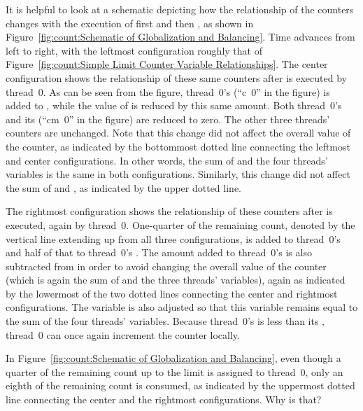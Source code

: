It is helpful to look at a schematic depicting how the relationship
of the counters changes with the execution of first
 and then , as shown in
Figure~\ref{fig:count:Schematic of Globalization and Balancing}.
Time advances from left to right, with the leftmost configuration
roughly that of
Figure~\ref{fig:count:Simple Limit Counter Variable Relationships}.
The center configuration shows the relationship of these same counters
after  is executed by thread~0.
As can be seen from the figure, thread~0's  (``c~0'' in
the figure) is added to , while the value of
 is reduced by this same amount.
Both thread~0's  and its 
(``cm~0'' in the figure) are reduced to zero.
The other three threads' counters are unchanged.
Note that this change did not affect the overall value of the counter,
as indicated by the bottommost dotted line connecting the leftmost
and center configurations.
In other words, the sum of  and the four threads'
 variables is the same in both configurations.
Similarly, this change did not affect the sum of  and
, as indicated by the upper dotted line.

The rightmost configuration shows the relationship of these counters
after  is executed, again by thread~0.
One-quarter of the remaining count, denoted by the vertical line extending
up from all three configurations, is added to thread~0's
 and half of that to thread~0's .
The amount added to thread~0's  is also subtracted from
 in order to avoid changing the overall value of the
counter (which is again the sum of  and the three
threads'  variables), again as indicated by the lowermost
of the two dotted lines connecting the center and rightmost configurations.
The  variable is also adjusted so that this variable
remains equal to the sum of the four threads' 
variables.
Because thread~0's  is less than its ,
thread~0 can once again increment the counter locally.

\QuickQuiz{}
	In Figure~\ref{fig:count:Schematic of Globalization and Balancing},
	even though a quarter of the remaining count up to the limit is
	assigned to thread~0, only an eighth of the remaining count is
	consumed, as indicated by the uppermost dotted line connecting
	the center and the rightmost configurations.
	Why is that?
 \QuickQuizEnd

